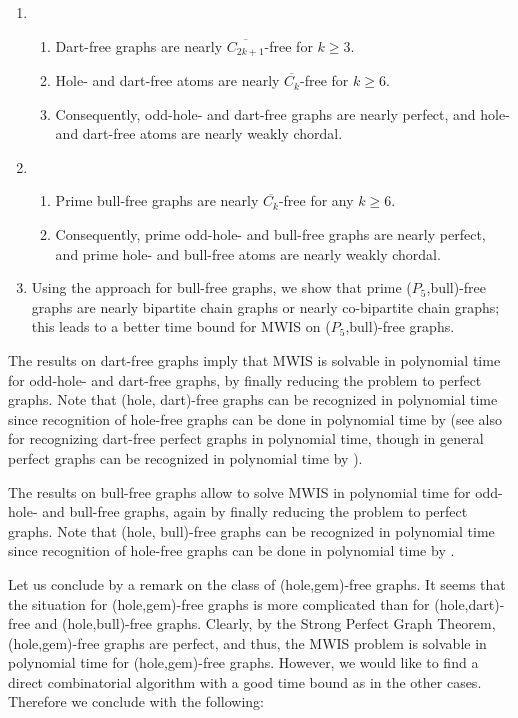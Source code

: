 \documentclass[11pt]{article}
\newcommand{\0}{\text{ has a co-join to }}
\newcommand{\1}{\text{ has a join to }}
\begin{document}
\begin{enumerate}
\item 
\begin{enumerate}
\item Dart-free graphs are nearly $\overline{C_{2k+1}}$-free for $k \ge 3$. 
\item Hole- and dart-free atoms are nearly $\overline{C_k}$-free for $k \geq 6$.
\item Consequently, odd-hole- and dart-free graphs are nearly perfect, and hole- and dart-free atoms are nearly weakly chordal.  
\end{enumerate}

\item 
\begin{enumerate}
\item Prime bull-free graphs are nearly $\overline{C_k}$-free for any $k \ge 6$.
\item Consequently, prime odd-hole- and bull-free graphs are nearly perfect, and prime hole- and bull-free atoms are nearly weakly chordal. 
\end{enumerate}

\item Using the approach for bull-free graphs, we show that prime ($P_5$,bull)-free graphs are nearly bipartite chain graphs or nearly co-bipartite chain graphs; this leads to a better time bound for MWIS on ($P_5$,bull)-free graphs.  
\end{enumerate}

The results on dart-free graphs imply that MWIS is solvable in polynomial time for odd-hole- and dart-free graphs, by finally reducing the problem to perfect graphs. Note that (hole, dart)-free graphs can be recognized in polynomial time since recognition of hole-free graphs can be done in polynomial time by \cite{Spinrad1991} (see also \cite{ChvFonSunZem2002} for recognizing dart-free perfect graphs in polynomial time, though in general perfect graphs can be recognized in polynomial time by \cite{ChuCorLiuSeyVus2005,CorLiuVus2003}).

\medskip

The results on bull-free graphs allow to solve MWIS in polynomial time for odd-hole- and bull-free graphs, again by finally reducing the problem to perfect graphs. Note that (hole, bull)-free graphs can be recognized in polynomial time since recognition of hole-free graphs can be done in polynomial time by \cite{Spinrad1991}. 

\medskip

Let us conclude by a remark on the class of (hole,gem)-free graphs. It seems that the situation for (hole,gem)-free graphs is more complicated than for (hole,dart)-free and (hole,bull)-free graphs. Clearly, by the Strong Perfect Graph Theorem, (hole,gem)-free graphs are perfect, and thus, the MWIS problem is solvable in polynomial time for (hole,gem)-free graphs. However, we would like to find a direct combinatorial algorithm with a good time bound as in the other cases. Therefore we conclude with the following: 
\end{document}

